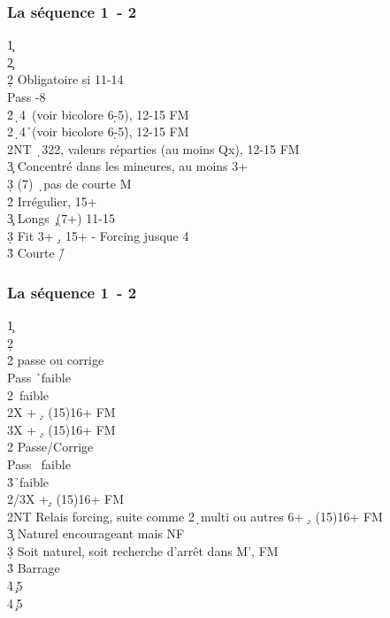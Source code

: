 \documentclass[a4paper]{article}
\begin{document}
\subsubsection{La séquence 1\pdfc\ - 2\pdfc}

\begin{bidtable}
1\c\+\\
2\c\+\\
2\d \> Obligatoire si 11-14\+\\
Pass -8\\
2\h {}\d\ 4\s\ (voir bicolore 6\d -5\s ), 12-15 FM\\
2\s {}\d\ 4\h\ (voir bicolore 6\d -5\h ), 12-15 FM\\
2NT \d\ 322, valeurs réparties (au moins Qx), 12-15 FM\\
3\c \> Concentré dans les mineures, au moins 3+\c \\
3\d {} (7) \d\ pas de courte M\-\\
2\h\s \> Irrégulier, 15+\\
3\c \> Longs \c\ (7+) 11-15\\
3\d \> Fit 3+ \d , 15+ - Forcing jusque 4\d \\
3\h\s \> Courte \h /\s \-\-
\end{bidtable}

\subsubsection{La séquence 1\pdfc\ - 2\pdfd}

\begin{bidtable}
1\c\+\\
2\d\+\\
2\h \> passe ou corrige\+\\
Pass \h\ faible\\
2\s {}\s\ faible\\
2X + \d , (15)16+ FM\\
3X + \d , (15)16+ FM\-\\
2\s \> Passe/Corrige\+\\
Pass \s\ faible\\
3\h {}\h\ faible\\
2/3X +\d , (15)16+ FM\-\\
2NT \> Relais forcing, suite comme 2\d\ multi ou autres 6+ \d , (15)16+ FM\\
3\c \> Naturel encourageant mais NF\\
3\d \> Soit naturel, soit recherche d'arrêt dans M', FM\\
3\h\s \> Barrage\\
4\h {}\c\ 5\h \\
4\s {}\c\ 5\s \-\-
\end{bidtable}
\end{document}
